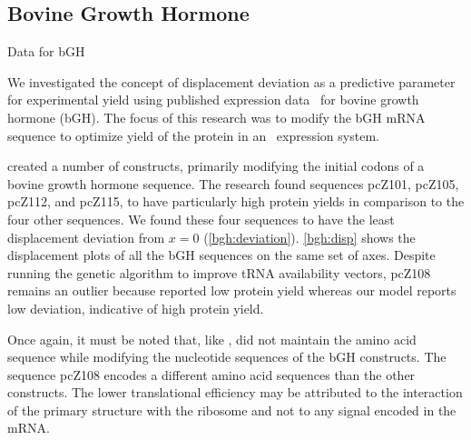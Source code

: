 \documentclass[12pt]{article}
\begin{document}
\subsection{Bovine Growth Hormone}
\label{section:bgh}

\begin{cfigure}
  \footnotesize
  \caption{Data for bGH}
\end{cfigure}

We investigated the concept of displacement deviation as a predictive parameter
for experimental yield using published expression data~\cite{schoner:bgh} for bovine growth hormone (bGH).
The focus of this research was to modify the bGH mRNA sequence to optimize
yield of the protein in an \ecoli\ expression system.

\citet{schoner:bgh} created a number of constructs, primarily modifying the initial codons of a
bovine growth hormone sequence.  The research found sequences pcZ101,
pcZ105, pcZ112, and pcZ115, to have particularly high protein yields
in comparison to the four other sequences. We found these four sequences  to have the least
displacement deviation from $x = 0$
(\autoref{bgh:deviation}). \autoref{bgh:disp} shows the displacement
plots of all the bGH sequences on the same set of axes. 
Despite running the genetic algorithm to improve tRNA availability vectors, pcZ108 remains an
outlier because \citeauthor{schoner:bgh} reported low protein
yield whereas our model reports low deviation, indicative of 
high protein yield.

Once again, it must be noted that, like \citeauthor{weiss87}, \citeauthor{schoner:bgh}
did not maintain the amino acid sequence while modifying the nucleotide sequences of the bGH constructs.
The sequence pcZ108 encodes a different amino acid sequences than the other constructs.
The lower translational efficiency may be attributed to the interaction
of the primary structure with the ribosome and not to any signal encoded
in the mRNA.
\end{document}
